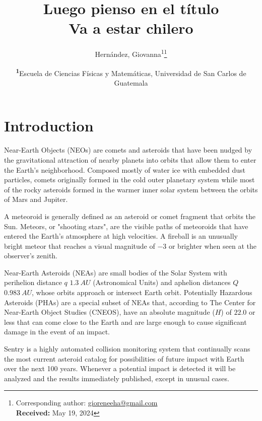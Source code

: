 \documentclass[
	a4paper, %
	10pt, %
	unnumberedsections, %
	twoside, %
]{LTJournalArticle}
\title{Luego pienso en el título\\ Va a estar chilero} %
\author{%
	Hernández, Giovanna\textsuperscript{1}\thanks{Corresponding author: \href{mailto:gioreneeha@gmail.com}{gioreneeha@gmail.com}\\ \textbf{Received:} May 19, 2024}
}
\date{\footnotesize\textsuperscript{\textbf{1}}Escuela de Ciencias Físicas y Matemáticas, Universidad de San Carlos de Guatemala}
\begin{document}
\maketitle %


\section{Introduction}

Near-Earth Objects (NEOs) are comets and asteroids that have been nudged by the gravitational
attraction of nearby planets into orbits that allow them to enter the Earth’s neighborhood. Composed
mostly of water ice with embedded dust particles, comets originally formed in the cold outer planetary
system while most of the rocky asteroids formed in the warmer inner solar system between the orbits of
Mars and Jupiter.  \supercite{nasaBasics}

A meteoroid is generally defined as an asteroid or comet fragment that orbits the Sun. Meteors, or
"shooting stars", are the visible paths of meteoroids that have entered the Earth’s atmosphere at high
velocities. A fireball is an unusually bright meteor that reaches a visual magnitude of $-3$ or
brighter when seen at the observer’s zenith. \supercite{nasaFireballs}

Near-Earth Asteroids (NEAs) are small bodies of the Solar System with perihelion distance $q$
$1.3\:AU$ (Astronomical Units) and aphelion distances $Q$ $0.983\:AU$, whose orbits approach or
intersect Earth orbit. \supercite{rukmini2016statistical} Potentially Hazardous Asteroids (PHAs) are a
special subset of NEAs that, according to The Center for Near-Earth Object Studies (CNEOS), have an
absolute magnitude ($H$) of $22.0$ or less that can come close to the Earth and are large enough to
cause significant damage in the event of an impact. \supercite{zhou2024martians}

Sentry is a highly automated collision monitoring system that continually scans the most current
asteroid catalog for possibilities of future impact with Earth over the next 100 years. Whenever a
potential impact is detected it will be analyzed and the results immediately published, except in
unusual cases. \supercite{nasaSentryEarth}

\end{document}
